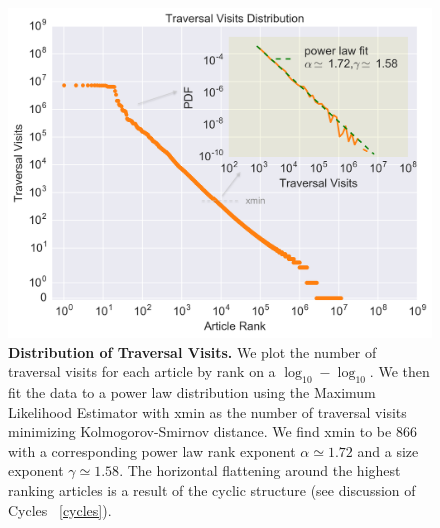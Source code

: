 \documentclass[pre,twocolumn,twoside,superscriptaddress,floatfix]{revtex4-1}
\begin{document}
{\begin{figure}[tp!]
  \includegraphics[width=\columnwidth]{traversals_per_article.pdf} 
  \caption{
    \textbf{Distribution of Traversal Visits.}
    We plot the number of traversal visits for each article by rank on a $\log_{10}-\log_{10}$. We then fit the data to a power law 
    distribution using the Maximum Likelihood Estimator with xmin as the number of traversal visits minimizing Kolmogorov-Smirnov distance. We find xmin to be 866 with a corresponding power law rank exponent $\alpha \simeq 1.72$ and a size exponent $\gamma \simeq 1.58$.
The horizontal flattening around the highest
ranking articles is a result of the cyclic structure (see discussion of Cycles ~\ref{cycles}).
}
  \label{fig:Distribution of Visits}
\end{figure}

}
\end{document}
